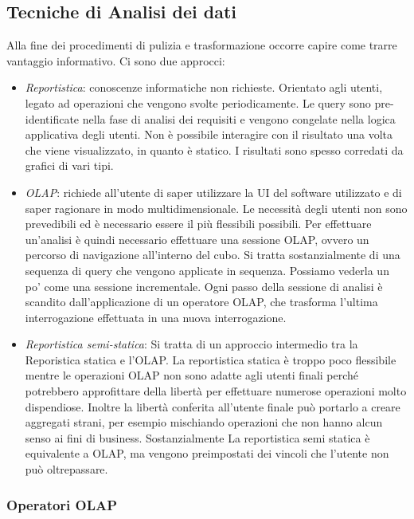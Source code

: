 \subsection{Tecniche di Analisi dei dati}
Alla fine dei procedimenti di pulizia e trasformazione occorre capire come trarre vantaggio informativo.
Ci sono due approcci:
\begin{itemize}
	\item \textit{Reportistica}: conoscenze informatiche non richieste. Orientato agli utenti, legato ad operazioni che vengono svolte periodicamente. Le query sono pre-identificate nella fase di analisi dei requisiti e vengono congelate nella logica applicativa degli utenti. Non è possibile interagire con il risultato una volta che viene visualizzato, in quanto è statico. I risultati sono spesso corredati da grafici di vari tipi.
	\item \textit{OLAP}: richiede all'utente di saper utilizzare la UI del software utilizzato e di saper ragionare in modo multidimensionale. Le necessità degli utenti non sono prevedibili ed è necessario essere il più flessibili possibili. Per effettuare un'analisi è quindi necessario effettuare una sessione OLAP, ovvero un percorso di navigazione all'interno del cubo. Si tratta sostanzialmente di una sequenza di query che vengono applicate in sequenza. Possiamo vederla un po' come una sessione incrementale. Ogni passo della sessione di analisi è scandito dall'applicazione di un operatore OLAP, che trasforma l'ultima interrogazione effettuata in una nuova interrogazione.
	\item \textit{Reportistica semi-statica}: Si tratta di un approccio intermedio tra la Reporistica statica e l'OLAP. La reportistica statica è troppo poco flessibile mentre le operazioni OLAP non sono adatte agli utenti finali perché potrebbero approfittare della libertà per effettuare numerose operazioni molto dispendiose. Inoltre la libertà conferita all'utente finale può portarlo a creare aggregati strani, per esempio mischiando operazioni che non hanno alcun senso ai fini di business. Sostanzialmente La reportistica semi statica è equivalente a OLAP, ma vengono preimpostati dei vincoli che l'utente non può oltrepassare.  
\end{itemize}

\subsubsection{Operatori OLAP}

